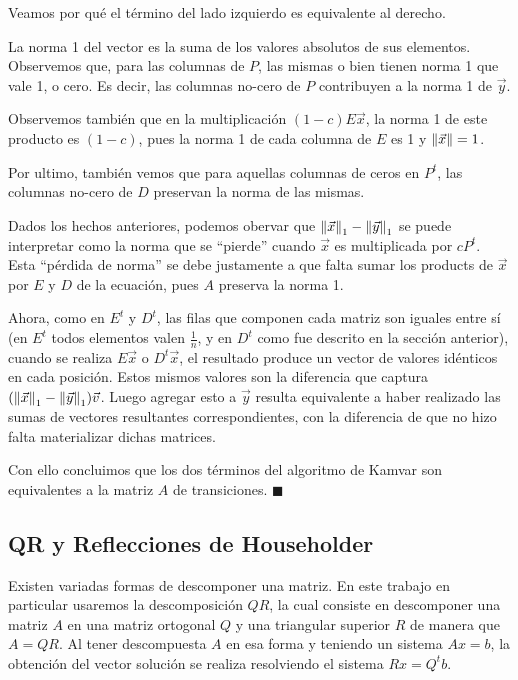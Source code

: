 Veamos por qué el término del lado izquierdo es equivalente al derecho.

La norma 1 del vector es la suma de los valores absolutos de sus elementos.
Observemos que, para las columnas de $P$, las mismas o bien tienen norma 1 que vale 1, o cero.
Es decir, las columnas no-cero de $P$ contribuyen a la norma 1 de $\vec{y}$.

Observemos también que en la multiplicación $(1-c)E\vec{x}$, la norma 1 de este producto es
$(1-c)$, pues la norma 1 de cada columna de $E$ es 1 y $\left\|\vec{x}\right\| = 1$.

Por ultimo, también vemos que para aquellas columnas de ceros en $P^{t}$, las columnas no-cero de
 $D$ preservan la norma de las mismas.

Dados los hechos anteriores, podemos obervar que $\left\|\vec{x}\right\|_1 - \left\|\vec{y}\right\|_1$ se
puede interpretar como la norma que se ``pierde'' cuando $\vec{x}$  es multiplicada por $cP^t$.
Esta ``pérdida de norma'' se debe justamente a que falta sumar los products de $\vec{x}$  por
$E$  y $D$ de la ecuación, pues $A$ preserva la norma 1.

Ahora, como en $E^t$ y $D^t$, las filas que componen cada matriz son iguales entre sí (en $E^t$ todos elementos valen $\frac{1}{n}$, y
en $D^t$ como fue descrito en la sección anterior), cuando se realiza $E\vec{x}$ o $D^t\vec{x}$, el resultado
produce un vector de valores idénticos en cada posición. Estos mismos valores son la diferencia que captura
$(\left\|\vec{x}\right\|_1 - \left\|\vec{y}\right\|_1) \vec{v}$. Luego agregar esto a $\vec{y}$ resulta
equivalente a haber realizado las sumas de vectores resultantes correspondientes, con la diferencia
de que no hizo falta materializar dichas matrices.

Con ello concluimos que los dos términos del algoritmo de Kamvar son equivalentes
a la matriz $A$ de transiciones. $ \blacksquare $

\subsection{QR y Reflecciones de Householder}

Existen variadas formas de descomponer una matriz. En este trabajo en particular usaremos la descomposición $QR$,
la cual consiste en descomponer una matriz $A$ en una matriz ortogonal $Q$ y una triangular superior $R$
de manera que $A = QR$. Al tener descompuesta $A$ en esa forma y teniendo un sistema $Ax= b$,
la obtención del vector solución se realiza resolviendo el sistema $Rx = Q^{t}b$.

